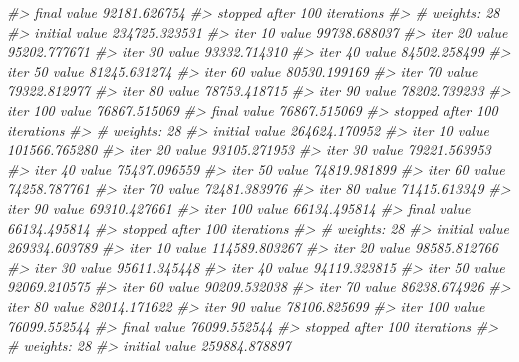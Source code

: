 \documentclass[
  graybox,natbib,nospthms]{svmono}
\newenvironment{Shaded}{\begin{snugshade}}{\end{snugshade}}
\newcommand{\CommentTok}[1]{\textcolor[rgb]{0.37,0.37,0.37}{\textit{#1}}}
\begin{document}
\begin{Shaded}
\begin{Highlighting}[]
\CommentTok{\#\textgreater{} final  value 92181.626754 }
\CommentTok{\#\textgreater{} stopped after 100 iterations}
\CommentTok{\#\textgreater{} \# weights:  28}
\CommentTok{\#\textgreater{} initial  value 234725.323531 }
\CommentTok{\#\textgreater{} iter  10 value 99738.688037}
\CommentTok{\#\textgreater{} iter  20 value 95202.777671}
\CommentTok{\#\textgreater{} iter  30 value 93332.714310}
\CommentTok{\#\textgreater{} iter  40 value 84502.258499}
\CommentTok{\#\textgreater{} iter  50 value 81245.631274}
\CommentTok{\#\textgreater{} iter  60 value 80530.199169}
\CommentTok{\#\textgreater{} iter  70 value 79322.812977}
\CommentTok{\#\textgreater{} iter  80 value 78753.418715}
\CommentTok{\#\textgreater{} iter  90 value 78202.739233}
\CommentTok{\#\textgreater{} iter 100 value 76867.515069}
\CommentTok{\#\textgreater{} final  value 76867.515069 }
\CommentTok{\#\textgreater{} stopped after 100 iterations}
\CommentTok{\#\textgreater{} \# weights:  28}
\CommentTok{\#\textgreater{} initial  value 264624.170952 }
\CommentTok{\#\textgreater{} iter  10 value 101566.765280}
\CommentTok{\#\textgreater{} iter  20 value 93105.271953}
\CommentTok{\#\textgreater{} iter  30 value 79221.563953}
\CommentTok{\#\textgreater{} iter  40 value 75437.096559}
\CommentTok{\#\textgreater{} iter  50 value 74819.981899}
\CommentTok{\#\textgreater{} iter  60 value 74258.787761}
\CommentTok{\#\textgreater{} iter  70 value 72481.383976}
\CommentTok{\#\textgreater{} iter  80 value 71415.613349}
\CommentTok{\#\textgreater{} iter  90 value 69310.427661}
\CommentTok{\#\textgreater{} iter 100 value 66134.495814}
\CommentTok{\#\textgreater{} final  value 66134.495814 }
\CommentTok{\#\textgreater{} stopped after 100 iterations}
\CommentTok{\#\textgreater{} \# weights:  28}
\CommentTok{\#\textgreater{} initial  value 269334.603789 }
\CommentTok{\#\textgreater{} iter  10 value 114589.803267}
\CommentTok{\#\textgreater{} iter  20 value 98585.812766}
\CommentTok{\#\textgreater{} iter  30 value 95611.345448}
\CommentTok{\#\textgreater{} iter  40 value 94119.323815}
\CommentTok{\#\textgreater{} iter  50 value 92069.210575}
\CommentTok{\#\textgreater{} iter  60 value 90209.532038}
\CommentTok{\#\textgreater{} iter  70 value 86238.674926}
\CommentTok{\#\textgreater{} iter  80 value 82014.171622}
\CommentTok{\#\textgreater{} iter  90 value 78106.825699}
\CommentTok{\#\textgreater{} iter 100 value 76099.552544}
\CommentTok{\#\textgreater{} final  value 76099.552544 }
\CommentTok{\#\textgreater{} stopped after 100 iterations}
\CommentTok{\#\textgreater{} \# weights:  28}
\CommentTok{\#\textgreater{} initial  value 259884.878897 }

\end{Highlighting}
\end{Shaded}
\end{document}
